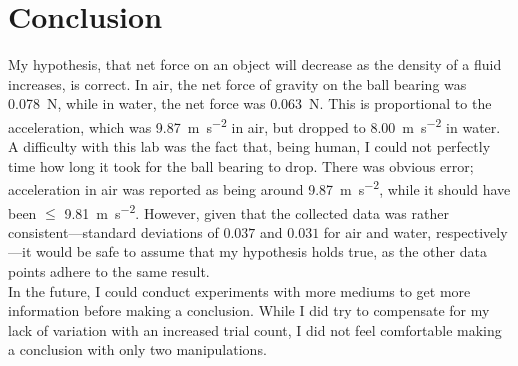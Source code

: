 \documentclass[a4paper]{article}
\begin{document}
    \section{Conclusion}
        My hypothesis, that net force on an object will decrease as the density of
        a fluid increases, is correct. In air, the net force of gravity on the ball
        bearing was \SI{0.078}{\N}, while in water, the net force was \SI{0.063}{\N}.
        This is proportional to the acceleration, which was \SI{9.87}{\m\per\s\squared}
        in air, but dropped to \SI{8.00}{\m\per\s\squared} in water.
        \\
        A difficulty with this lab was the fact that, being human, I could not perfectly
        time how long it took for the ball bearing to drop. There was obvious error;
        acceleration in air was reported as being around \SI{9.87}{\m\per\s\squared},
        while it should have been $\leq$ \SI{9.81}{\m\per\s\squared}. However, given
        that the collected data was rather consistent---standard deviations of $0.037$
        and $0.031$ for air and water, respectively---it would be safe to assume that
        my hypothesis holds true, as the other data points adhere to the same result.
        \\
        In the future, I could conduct experiments with more mediums to get more information
        before making a conclusion. While I did try to compensate for my lack of variation
        with an increased trial count, I did not feel comfortable making a conclusion
        with only two manipulations.
\end{document}
